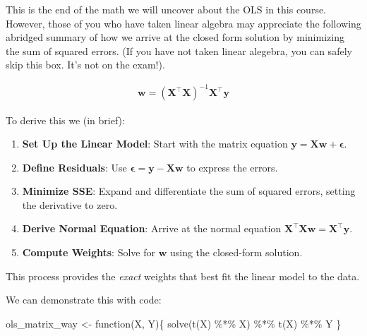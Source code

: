 \documentclass[
  letterpaper,
  DIV=11,
  numbers=noendperiod]{scrartcl}
\newenvironment{Shaded}{}{}
\newcommand{\ControlFlowTok}[1]{\textcolor[rgb]{0.84,0.23,0.29}{#1}}
\newcommand{\FunctionTok}[1]{\textcolor[rgb]{0.44,0.26,0.76}{#1}}
\newcommand{\NormalTok}[1]{\textcolor[rgb]{0.14,0.16,0.18}{#1}}
\newcommand{\OtherTok}[1]{\textcolor[rgb]{0.44,0.26,0.76}{#1}}
\newcommand{\SpecialCharTok}[1]{\textcolor[rgb]{0.00,0.36,0.77}{#1}}
\providecommand{\tightlist}{%
  \setlength{\itemsep}{0pt}\setlength{\parskip}{0pt}}\usepackage{longtable,booktabs,array}
\begin{document}
\begin{tcolorbox}[enhanced jigsaw, title=\textcolor{quarto-callout-tip-color}{\faLightbulb}\hspace{0.5em}{Box 1: Summary of OLS solution}, opacitybacktitle=0.6, toprule=.15mm, bottomtitle=1mm, colbacktitle=quarto-callout-tip-color!10!white, arc=.35mm, titlerule=0mm, toptitle=1mm, breakable, coltitle=black, bottomrule=.15mm, colback=white, colframe=quarto-callout-tip-color-frame, opacityback=0, leftrule=.75mm, left=2mm, rightrule=.15mm]

This is the end of the math we will uncover about the OLS in this
course. However, those of you who have taken linear algebra may
appreciate the following abridged summary of how we arrive at the closed
form solution by minimizing the sum of squared errors. (If you have not
taken linear alegebra, you can safely skip this box. It's not on the
exam!).

\[
\begin{align}
\mathbf{w} = (\mathbf{X}^\top \mathbf{X})^{-1} \mathbf{X}^\top \mathbf{y}
\end{align}
\]

To derive this we (in brief):

\begin{enumerate}
\def\labelenumi{\arabic{enumi}.}
\tightlist
\item
  \textbf{Set Up the Linear Model}: Start with the matrix equation
  \(\mathbf{y} = \mathbf{X} \mathbf{w} + \mathbf{\epsilon}\).
\item
  \textbf{Define Residuals}: Use
  \(\mathbf{\epsilon} = \mathbf{y} - \mathbf{X} \mathbf{w}\) to express
  the errors.
\item
  \textbf{Minimize SSE}: Expand and differentiate the sum of squared
  errors, setting the derivative to zero.
\item
  \textbf{Derive Normal Equation}: Arrive at the normal equation
  \(\mathbf{X}^\top \mathbf{X} \mathbf{w} = \mathbf{X}^\top \mathbf{y}\).
\item
  \textbf{Compute Weights}: Solve for \(\mathbf{w}\) using the
  closed-form solution.
\end{enumerate}

This process provides the \emph{exact} weights that best fit the linear
model to the data.

\end{tcolorbox}

We can demonstrate this with code:

\begin{Shaded}
\begin{Highlighting}[]
\NormalTok{ ols\_matrix\_way }\OtherTok{\textless{}{-}} \ControlFlowTok{function}\NormalTok{(X, Y)\{}
  \FunctionTok{solve}\NormalTok{(}\FunctionTok{t}\NormalTok{(X) }\SpecialCharTok{\%*\%}\NormalTok{ X) }\SpecialCharTok{\%*\%} \FunctionTok{t}\NormalTok{(X) }\SpecialCharTok{\%*\%}\NormalTok{ Y}
\NormalTok{ \}}
\end{Highlighting}
\end{Shaded}
\end{document}

